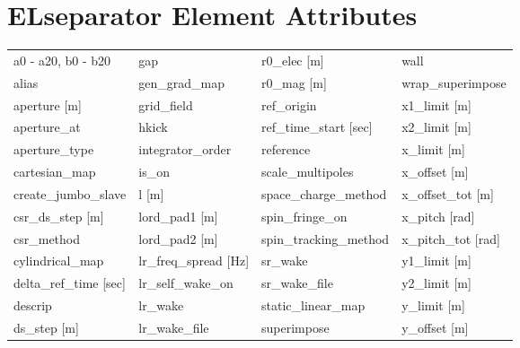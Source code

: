  \section{ELseparator Element Attributes}
 \label{s:list.elseparator}
 
 \begin{tabular}{llll} \toprule
a0 - a20, b0 - b20               & gap                              & r0_elec [m]                      & wall                             \\
alias                            & gen_grad_map                     & r0_mag [m]                       & wrap_superimpose                 \\
aperture [m]                     & grid_field                       & ref_origin                       & x1_limit [m]                     \\
aperture_at                      & hkick                            & ref_time_start [sec]             & x2_limit [m]                     \\
aperture_type                    & integrator_order                 & reference                        & x_limit [m]                      \\
cartesian_map                    & is_on                            & scale_multipoles                 & x_offset [m]                     \\
create_jumbo_slave               & l [m]                            & space_charge_method              & x_offset_tot [m]                 \\
csr_ds_step [m]                  & lord_pad1 [m]                    & spin_fringe_on                   & x_pitch [rad]                    \\
csr_method                       & lord_pad2 [m]                    & spin_tracking_method             & x_pitch_tot [rad]                \\
cylindrical_map                  & lr_freq_spread [Hz]              & sr_wake                          & y1_limit [m]                     \\
delta_ref_time [sec]             & lr_self_wake_on                  & sr_wake_file                     & y2_limit [m]                     \\
descrip                          & lr_wake                          & static_linear_map                & y_limit [m]                      \\
ds_step [m]                      & lr_wake_file                     & superimpose                      & y_offset [m]                     \\

\end{tabular}
